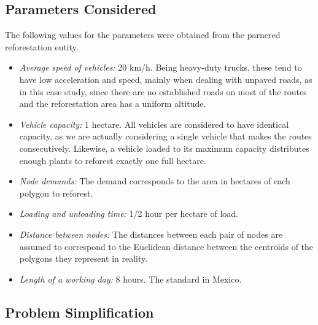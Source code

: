 \documentclass{amsart}
\begin{document}
    \subsection{Parameters Considered}
    
    The following values for the parameters were obtained from the parnered reforestation entity.
    
    \begin{itemize}
        \item \textit{Average speed of vehicles:} 20 km/h. Being heavy-duty trucks, these tend to have low acceleration and speed, mainly when dealing with unpaved roads, as in this case study, since there are no established roads on most of the routes and the reforestation area has a uniform altitude.
        \item \textit{Vehicle capacity:} 1 hectare. All vehicles are considered to have identical capacity, as we are actually considering a single vehicle that makes the routes consecutively. Likewise, a vehicle loaded to its maximum capacity distributes enough plants to reforest exactly one full hectare.
        \item \textit{Node demands:} The demand corresponds to the area in hectares of each polygon to reforest.
        \item \textit{Loading and unloading time:} 1/2 hour per hectare of load.
        \item \textit{Distance between nodes:} The distances between each pair of nodes are assumed to correspond to the Euclidean distance between the centroids of the polygons they represent in reality.
        \item \textit{Length of a working day:} 8 hours. The standard in Mexico.
    \end{itemize}
    
    
    
    
    \subsection{Problem Simplification}
    
\end{document}
